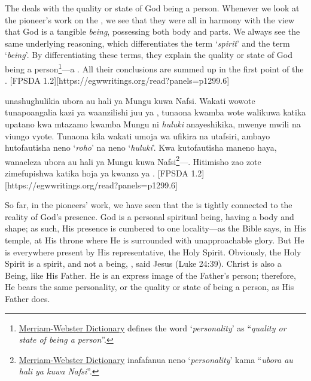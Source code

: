 



The  deals with the quality or state of God being a person. Whenever we look at the pioneer's work on the , we see that they were all in harmony with the view that God is a tangible \textit{being}, possessing both body and parts. We always see the same underlying reasoning, which differentiates the term ‘\textit{spirit}’ and the term ‘\textit{being}’. By differentiating these terms, they explain the quality or state of God being a person\footnote{\href{https://www.merriam-webster.com/dictionary/personality}{Merriam-Webster Dictionary} defines the word ‘\textit{personality}’ as “\textit{quality or state of being a person}”.}—a . All their conclusions are summed up in the first point of the . [FPSDA 1.2][https://egwwritings.org/read?panels=p1299.6]


 unashughulikia ubora au hali ya Mungu kuwa Nafsi. Wakati wowote tunapoangalia kazi ya waanzilishi juu ya , tunaona kwamba wote walikuwa katika upatano kwa mtazamo kwamba Mungu ni \textit{huluki} anayeshikika, mwenye mwili na viungo vyote. Tunaona kila wakati umoja wa ufikira na utafsiri, ambayo hutofautisha neno ‘\textit{roho}’ na neno ‘\textit{huluki}’. Kwa kutofautisha maneno haya, wanaeleza ubora au hali ya Mungu kuwa Nafsi\footnote{\href{https://www.merriam-webster.com/dictionary/personality}{Merriam-Webster Dictionary} inafafanua neno ‘\textit{personality}’ kama “\textit{ubora au hali ya kuwa Nafsi}”.}—. Hitimisho zao zote zimefupishwa katika hoja ya kwanza ya . [FPSDA 1.2][https://egwwritings.org/read?panels=p1299.6]


So far, in the pioneers’ work, we have seen that the  is tightly connected to the reality of God’s presence. God is a personal spiritual being, having a body and shape; as such, His presence is cumbered to one locality—as the Bible says, in His temple, at His throne where He is surrounded with unapproachable glory. But He is everywhere present by His representative, the Holy Spirit. Obviously, the Holy Spirit is a spirit, and not a being, , said Jesus (Luke 24:39). Christ is also a Being, like His Father. He is an express image of the Father’s person; therefore, He bears the same personality, or the quality or state of being a person, as His Father does.


